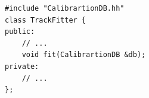 \documentclass[twoside]{article}
\begin{document}
{\footnotesize
\begin{verbatim}
#include "CalibrartionDB.hh"
class TrackFitter {
public:
    // ...
    void fit(CalibrartionDB &db);
private:
    // ...
};
\end{verbatim}
}%

%
%

\printindex
\end{document}
